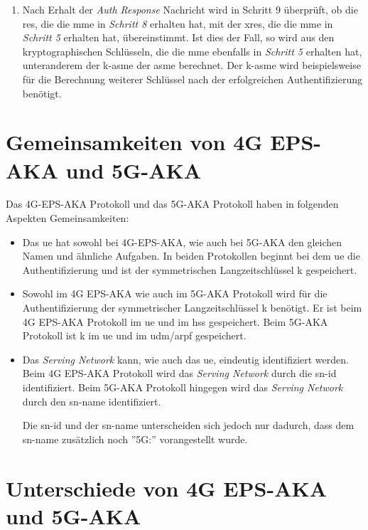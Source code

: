\begin{enumerate}
\item Nach Erhalt der \textit{Auth Response} Nachricht wird in Schritt 9 überprüft, ob die \gls{res}, die die \gls{mme} in \textit{Schritt 8} erhalten hat, mit der \gls{xres}, die die \gls{mme} in \textit{Schritt 5} erhalten hat, übereinstimmt.
Ist dies der Fall, so wird aus den kryptographischen Schlüsseln, die die \gls{mme} ebenfalls in \textit{Schritt 5} erhalten hat, unteranderem der \gls{k-asme} der \gls{asme} berechnet.
Der \gls{k-asme} wird beispielsweise für die Berechnung weiterer Schlüssel nach der erfolgreichen Authentifizierung benötigt.%
\end{enumerate}


\section{Gemeinsamkeiten von 4G EPS-AKA und 5G-AKA}
Das 4G-EPS-AKA Protokoll und das 5G-AKA Protokoll haben in folgenden Aspekten Gemeinsamkeiten: %

\begin{itemize}
\item Das \gls{ue} hat sowohl bei 4G-EPS-AKA, wie auch bei 5G-AKA den gleichen Namen und ähnliche Aufgaben.
In beiden Protokollen beginnt bei dem \gls{ue} die Authentifizierung und ist der symmetrischen Langzeitschlüssel \gls{k} gespeichert.

\item Sowohl im 4G EPS-AKA wie auch im 5G-AKA Protokoll wird für die Authentifizierung der symmetrischer Langzeitschlüssel \gls{k} benötigt.
Er ist beim 4G EPS-AKA Protokoll im \gls{ue} und im \gls{hss} gespeichert.
Beim 5G-AKA Protokoll ist \gls{k} im \gls{ue} und im \gls{udm}/\gls{arpf} gespeichert.

\item Das \textit{Serving Network} kann, wie auch das \gls{ue}, eindeutig identifiziert werden.
Beim 4G EPS-AKA Protokoll wird das \textit{Serving Network} durch die \gls{sn-id} identifiziert.
Beim 5G-AKA Protokoll hingegen wird das \textit{Serving Network} durch den \gls{sn-name} identifiziert.

Die \gls{sn-id} und der \gls{sn-name} unterscheiden sich jedoch nur dadurch, dass dem \gls{sn-name} zusätzlich noch ''5G:'' vorangestellt wurde.
\end{itemize}


\section{Unterschiede von 4G EPS-AKA und 5G-AKA}

